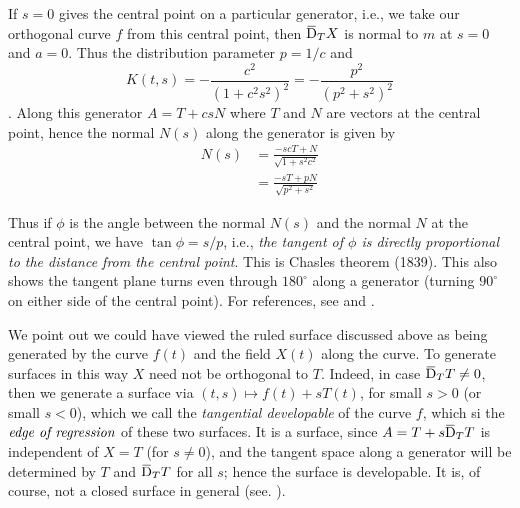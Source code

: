 \documentclass[../main]{subfiles}
\begin{document}
If $s=0$ gives the central point on a particular generator, i.e., we take our orthogonal curve $f$ from this central point, then $\covariant_TX$ is normal to $m$ at $s=0$ and $a=0$. Thus the distribution parameter $p=1/c$ and \[K(t,s) = -\dfrac{c^2}{(1+c^2s^2)^2}=-\dfrac{p^2}{(p^2+s^2)^2}\]. Along this generator $A = T+csN$ where $T$ and $N$ are vectors at the central point, hence the normal $N(s)$ along the generator is given by
\[ 
\begin{aligned}
N(s) &= \frac{-scT + N}{\sqrt{1+s^2c^2}} \\
&= \frac{-sT + pN}{\sqrt{p^2+s^2}}
\end{aligned}
\]

Thus if $\phi$ is the angle between the normal $N(s)$ and the normal $N$ at the central point, we have $\tan \phi = s/p$, i.e., \emph{the tangent of $\phi$ is directly proportional to the distance from the central point}. This is Chasles theorem (1839). This also shows the tangent plane turns even through $180^\circ$ along a generator (turning $90^\circ$ on either side of the central point). For references, see \cite[p. 189]{struik1961lectures} and \cite[p. 107]{willmore1959introduction}. 

We point out we could have viewed the ruled surface discussed above as being generated by the curve $f(t)$ and the field $X(t)$ along the curve. To generate surfaces in this way $X$ need not be orthogonal to $T$. Indeed, in case $\covariant_TT\ne 0$, then we generate a surface via $(t,s) \mapsto f(t) + sT(t)$, for small $s> 0$ (or small $s < 0$), which we call the \emph{tangential developable} of the curve $f$, which si the $\emph{edge of regression}$ of these two surfaces. It is a surface, since $A = T+s\covariant_TT$ is independent of $X=T$ (for $s\ne 0$), and the tangent space along a generator will be determined by $T$ and $\covariant_TT$ for all $s$; hence the surface is developable. It is, of course, not a closed surface in general (see. \cite[p. 66]{struik1961lectures}). 
\begin{center}
\end{center}
\end{document}

